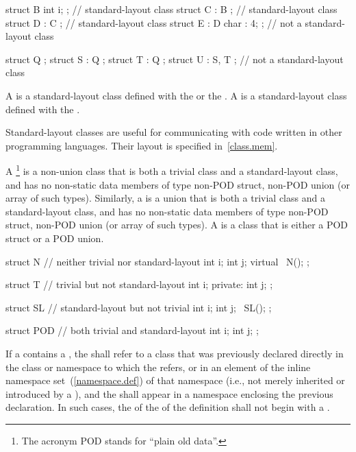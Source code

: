 \enterexample
\begin{codeblock}
   struct B { int i; };         // standard-layout class
   struct C : B { };            // standard-layout class
   struct D : C { };            // standard-layout class
   struct E : D { char : 4; };  // not a standard-layout class

   struct Q {};
   struct S : Q { };
   struct T : Q { };
   struct U : S, T { };         // not a standard-layout class
\end{codeblock}
\exitexample

%
%
%
%
\pnum
A  is a standard-layout class
defined with the   or the
 .
A  is a standard-layout class
defined with the
 .

\pnum
\enternote Standard-layout classes are useful for communicating with
code written in other programming languages. Their layout is specified
in~\ref{class.mem}.\exitnote

\pnum
{}%
A \footnote{The acronym POD stands for ``plain old data''.}
is a non-union class that is both a trivial class and a
standard-layout class, and has no non-static data members of type non-POD struct,
non-POD union (or array of such types). Similarly, a
 is a union that is both a trivial class and a standard-layout
class, and has no non-static data members of type non-POD struct, non-POD
union (or array of such types). A  is a
class that is either a POD struct or a POD union.

\enterexample
\begin{codeblock}
struct N {          // neither trivial nor standard-layout
  int i;
  int j;
  virtual ~N();
};

struct T {          // trivial but not standard-layout
  int i;
private: 
  int j;
};

struct SL {         // standard-layout but not trivial
  int i;
  int j;
  ~SL();
};

struct POD {        // both trivial and standard-layout
  int i;
  int j;
};
\end{codeblock}
\exitexample

\pnum
If a  contains a ,
the  shall refer to a class that was
previously declared directly in the class or namespace to which the
 refers,
or in an element of the inline namespace set~(\ref{namespace.def}) of that namespace
(i.e., not merely inherited or
introduced by a ), and the
 shall appear in a namespace enclosing the
previous declaration.
In such cases, the  of the
 of the
definition shall not begin with a .

